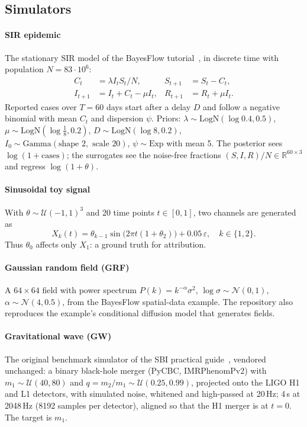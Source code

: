 \documentclass[conference]{IEEEtran}
\begin{document}
\subsection{Simulators}

\paragraph{SIR epidemic} The stationary SIR model of the BayesFlow tutorial~\cite{radev2021outbreakflow}, in
discrete time with population $N=83\cdot10^6$:
\begin{equation}
\begin{aligned}
  C_t &= \lambda I_t S_t/N, & S_{t+1} &= S_t - C_t,\\
  I_{t+1} &= I_t + C_t - \mu I_t, & R_{t+1} &= R_t + \mu I_t .
\end{aligned}
\end{equation}
Reported cases over $T=60$ days start after a delay $D$ and follow a negative binomial with mean $C_t$ and
dispersion $\psi$. Priors: $\lambda\sim\mathrm{LogN}(\log 0.4,0.5)$, $\mu\sim\mathrm{LogN}(\log\tfrac18,0.2)$,
$D\sim\mathrm{LogN}(\log 8,0.2)$, $I_0\sim\mathrm{Gamma}(\text{shape }2,\text{ scale }20)$, $\psi\sim\mathrm{Exp}$ with mean 5. The posterior sees
$\log(1+\text{cases})$; the surrogates see the noise-free fractions $(S,I,R)/N\in\mathbb{R}^{60\times3}$ and regress
$\log(1+\theta)$.

\paragraph{Sinusoidal toy signal} With $\theta\sim\mathcal{U}(-1,1)^3$ and 20 time points $t\in[0,1]$, two
channels are generated as
\begin{equation}
  X_k(t)=\theta_{k-1}\sin\!\big(2\pi t(1+\theta_2)\big)+0.05\,\varepsilon,\quad k\in\{1,2\}.
\end{equation}
Thus $\theta_0$ affects only $X_1$: a ground truth for attribution.

\paragraph{Gaussian random field (GRF)} A $64\times64$ field with power spectrum $P(k)=k^{-\alpha}\sigma^2$,
$\log\sigma\sim\mathcal{N}(0,1)$, $\alpha\sim\mathcal{N}(4,0.5)$, from the BayesFlow spatial-data
example. The repository also reproduces the example's conditional diffusion model that generates fields.

\paragraph{Gravitational wave (GW)} The original benchmark simulator of the SBI practical
guide~\cite{deistler2025practical}, vendored unchanged: a binary black-hole merger (PyCBC, IMRPhenomPv2) with
$m_1\sim\mathcal{U}(40,80)$ and $q=m_2/m_1\sim\mathcal{U}(0.25,0.99)$, projected onto the LIGO H1 and L1
detectors, with simulated noise, whitened and high-passed at 20\,Hz; 4\,s at 2048\,Hz (8192 samples per
detector), aligned so that the H1 merger is at $t=0$. The target is $m_1$.
\end{document}
